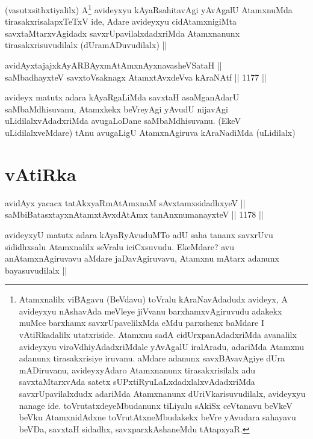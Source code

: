 \begin{artha}
(vasutxsithxtiyalilx) A\footnote{Atamxnalilx viBAgavu (BeVdavu) toVralu kAraNavAdadudx avideyx, A avideyxyu nAshavAda meVleye jiVvanu barxhamxvAgiruvudu adakekx muMce barxhamx savxrUpavelilxMda eMdu parxshenx baMdare I vAtiRkadalilx utatxriside. Atamxnu sadA cidUrxpanAdadxriMda avanalilx avideyxyu viroVdhiyAdadxriMdale yAvAgalU iralAradu, adariMda Atamxnu adanunx tirasakxrisiye iruvanu. aMdare adanunx savxBAvavAgiye dUra mADiruvanu, avideyxyAdaro Atamxnanunx tirasakxrisilalx adu savxtaMtarxvAda satetx sUPxtiRyuLaLxdadxlalxvAdadxriMda savxrUpavilalxdudx adariMda Atamxnanunx dUriVkarisuvudilalx, avideyxyu nanage ide. toVrutatxdeyeMbudanunx tiLiyalu sAkiSx ceVtanavu beVkeV beVku AtamxnidAdxne toVrutAtxneMbudakekx beVre yAvudara sahayavu beVDa, savxtaH sidadhx, savxparxkAshaneMdu tAtapxyaR.} avideyxyu kAyaRsahitavAgi yAvAgalU AtamxnuMda tirasakxrisalapxTeTxV ide, Adare avideyxyu cidAtamxnigiMta savxtaMtarxvAgidadx savxrUpavilalxdadxriMda Atamxnanunx tirasakxrisuvudilalx (dUramADuvudilalx) ||
\end{artha}


\begin{shl}
avidAyxtajajxkAyARBAyxmAtAmx\s nAyxnavasheVSataH || \\
saMbadhayxteV savxtoV\s saknagx AtamxtAvxdeVva kAraNAtf ||  1177 ||  
\end{shl}

\begin{artha}
avideyx matutx adara kAyaRgaLiMda savxtaH asaMganAdarU saMbaMdhisuvanu, Atamxkekx beVreyAgi yAvudU nijavAgi uLidilalxvAdadxriMda avugaLoDane saMbaMdhisuvanu. (EkeV uLidilalxveMdare) tAnu avugaLigU AtamxnAgiruva kAraNadiMda (uLidilalx)
\end{artha}

\section*{vAtiRka}

\begin{shl}
avidAyx yacacx tatAkxyaRmAtAmxnaM sAvxtamxsidadhxyeV ||  \\
saMbiBatasxtayxnAtamxtAvxdAtAmx tanAnxnumanayxteV ||  1178 ||  
\end{shl}

\begin{artha}
avideyxyU matutx adara kAyaRyAvuduMTo adU saha tananx savxrUvu sididhxsalu Atamxnalilx seVralu iciCxsuvudu. EkeMdare? avu anAtamxnAgiruvavu aMdare jaDavAgiruvavu, Atamxnu mAtarx adanunx bayasuvudilalx ||
\end{artha}

